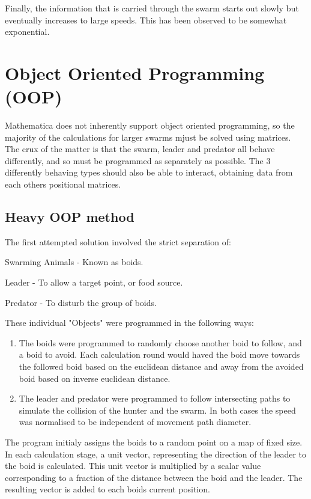 \documentclass[
reprint,
showpacs,preprintnumbers,
amsmath,amssymb,
prl,
]{revtex4-1}
\begin{document}
Finally, the information that is carried through the swarm starts out slowly but eventually increases to large speeds. This has been observed to be somewhat exponential. %

\section{\label{sec:level1}Object Oriented Programming (OOP)}

Mathematica does not inherently support object oriented programming, so the majority of the calculations for larger swarms mjust be solved using matrices.
The crux of the matter is that the swarm, leader and predator all behave differently, and so must be programmed as separately as possible.
The 3 differently behaving types should also be able to interact, obtaining data from each others positional matrices.

\subsection{\label{sec:level2}Heavy OOP method}

The first attempted solution involved the strict separation of:
\begin{description}
	\item{Swarming Animals - Known as boids.}
	\item{Leader - To allow a target point, or food source.}
	\item{Predator - To disturb the group of boids.}
\end{description}

These individual "Objects" were programmed in the following ways:
\begin{enumerate}
	\item{
		The boids were programmed to randomly choose another boid to follow, and a boid to avoid.
		Each calculation round would haved the boid move towards the followed boid based on the euclidean distance and away from the avoided boid based on inverse euclidean distance.
 }
 	\item{
		The leader and predator were programmed to follow intersecting paths to simulate the collision of the hunter and the swarm.
		In both cases the speed was normalised to be independent of movement path diameter.
	}
\end{enumerate}

The program initialy assigns the boids to a random point on a map of fixed size.
In each calculation stage, a unit vector, representing the direction of the leader to the boid is calculated.
This unit vector is multiplied by a scalar value corresponding to a fraction of the distance between the boid and the leader.
The resulting vector is added to each boids current position.
\end{document}
